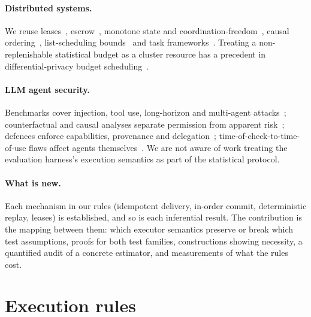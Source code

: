 \documentclass[pdflatex,sn-mathphys-num]{sn-jnl}
\theoremstyle{thmstyleone}
\theoremstyle{thmstyletwo}
\theoremstyle{thmstylethree}
\begin{document}
\paragraph{Distributed systems.} We reuse leases~\cite{gray1989leases}, escrow~\cite{oneil1986escrow}, monotone state and coordination-freedom~\cite{shapiro2011crdt,hellerstein2020calm}, causal ordering~\cite{lamport1978,chandy1985}, list-scheduling bounds~\cite{graham1969} and task frameworks~\cite{moritz2018ray}. Treating a non-replenishable statistical budget as a cluster resource has a precedent in differential-privacy budget scheduling~\cite{luo2021privatekube}.

\paragraph{LLM agent security.} Benchmarks cover injection, tool use, long-horizon and multi-agent attacks~\cite{debenedetti2024agentdojo,zhan2024injecagent,jiang2026agentlab,tamas2025,darkside2025,mazeika2024harmbench}; counterfactual and causal analyses separate permission from apparent risk~\cite{yang2026agentboundary,mothukuri2026causaltrace}; defences enforce capabilities, provenance and delegation~\cite{debenedetti2025camel,south2025delegation,pang2019zanzibar,birgisson2014macaroons}; time-of-check-to-time-of-use flaws affect agents themselves~\cite{lilienthal2025toctou}. We are not aware of work treating the evaluation harness's execution semantics as part of the statistical protocol.

\paragraph{What is new.} Each mechanism in our rules (idempotent delivery, in-order commit, deterministic replay, leases) is established, and so is each inferential result. The contribution is the mapping between them: which executor semantics preserve or break which test assumptions, proofs for both test families, constructions showing necessity, a quantified audit of a concrete estimator, and measurements of what the rules cost.

\section{Execution rules}\label{sec:rules}
\end{document}
